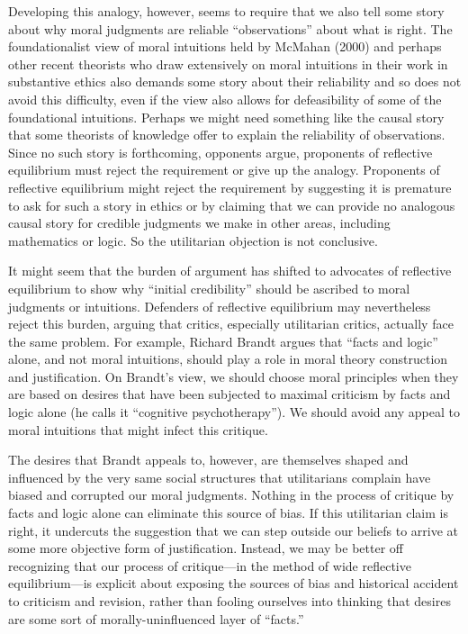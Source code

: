 \documentclass[]{article}
\begin{document}
Developing this analogy, however, seems to require that we also tell
some story about why moral judgments are reliable ``observations'' about
what is right. The foundationalist view of moral intuitions held by
McMahan (2000) and perhaps other recent theorists who draw extensively
on moral intuitions in their work in substantive ethics also demands
some story about their reliability and so does not avoid this
difficulty, even if the view also allows for defeasibility of some of
the foundational intuitions. Perhaps we might need something like the
causal story that some theorists of knowledge offer to explain the
reliability of observations. Since no such story is forthcoming,
opponents argue, proponents of reflective equilibrium must reject the
requirement or give up the analogy. Proponents of reflective equilibrium
might reject the requirement by suggesting it is premature to ask for
such a story in ethics or by claiming that we can provide no analogous
causal story for credible judgments we make in other areas, including
mathematics or logic. So the utilitarian objection is not conclusive.

It might seem that the burden of argument has shifted to advocates of
reflective equilibrium to show why ``initial credibility'' should be
ascribed to moral judgments or intuitions. Defenders of reflective
equilibrium may nevertheless reject this burden, arguing that critics,
especially utilitarian critics, actually face the same problem. For
example, Richard Brandt argues that ``facts and logic'' alone, and not
moral intuitions, should play a role in moral theory construction and
justification. On Brandt's view, we should choose moral principles when
they are based on desires that have been subjected to maximal criticism
by facts and logic alone (he calls it ``cognitive psychotherapy''). We
should avoid any appeal to moral intuitions that might infect this
critique.

The desires that Brandt appeals to, however, are themselves shaped and
influenced by the very same social structures that utilitarians complain
have biased and corrupted our moral judgments. Nothing in the process of
critique by facts and logic alone can eliminate this source of bias. If
this utilitarian claim is right, it undercuts the suggestion that we can
step outside our beliefs to arrive at some more objective form of
justification. Instead, we may be better off recognizing that our
process of critique---in the method of wide reflective equilibrium---is
explicit about exposing the sources of bias and historical accident to
criticism and revision, rather than fooling ourselves into thinking that
desires are some sort of morally-uninfluenced layer of ``facts.''
\end{document}
